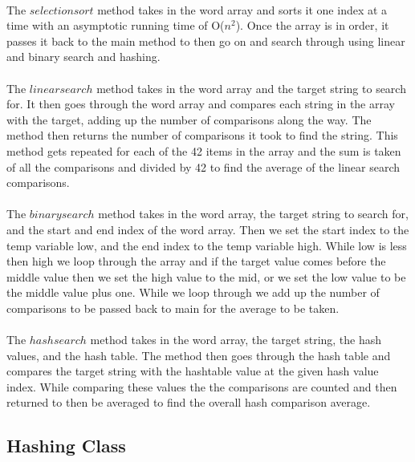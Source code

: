 \documentclass[letterpaper, 10pt,DIV=13]{scrartcl}
\numberwithin{equation}{section} %
\numberwithin{figure}{section} %
\numberwithin{table}{section} %
\begin{document}
\paragraph{} The $selection sort$ method takes in the word array and sorts it one index at a time with an asymptotic running time of O($n^2$). Once the array is in order, it passes it back to the main method to then go on and search through using linear and binary search and hashing. 

\paragraph{} The $linear search$ method takes in the word array and the target string to search for. It then goes through the word array and compares each string in the array with the target, adding up the number of comparisons along the way. The method then returns the number of comparisons it took to find the string. This method gets repeated for each of the 42 items in the array and the sum is taken of all the comparisons and divided by 42 to find the average of the linear search comparisons. 

\paragraph{} The $binary search$ method takes in the word array, the target string to search for, and the start and end index of the word array. Then we set the start index to the temp variable low, and the end index to the temp variable high. While low is less then high we loop through the array and if the target value comes before the middle value then we set the high value to the mid, or we set the low value to be the middle value plus one. While we loop through we add up the number of comparisons to be passed back to main for the average to be taken. 

\paragraph{} The $hash search$ method takes in the word array, the target string, the hash values, and the hash table. The method then goes through the hash table and compares the target string with the hashtable value at the given hash value index. While comparing these values the the comparisons are counted and then returned to then be averaged to find the overall hash comparison average. 

\subsection{Hashing Class}
\end{document}
